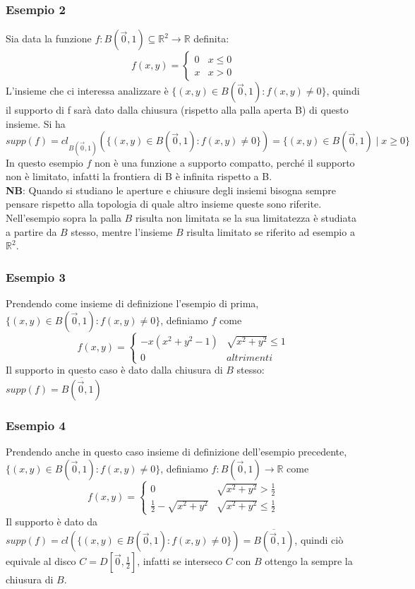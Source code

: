 \documentclass[10pt]{article}
\theoremstyle{plain}
\theoremstyle{definition}
\begin{document}
\subsubsection{Esempio 2}
Sia data la funzione $f: B(\vec{0},1) \subseteq \mathbb{R}^2 \to \mathbb{R}$ definita:
$$f(x,y)=
\begin{cases}
 0 & x \leq 0 \\
 x & x > 0
\end{cases}$$
L'insieme che ci interessa analizzare è $\{ (x,y) \in B(\vec{0},1): f(x,y) \neq 0 \}$, quindi il supporto di f sarà dato dalla chiusura (rispetto alla palla aperta B) di questo insieme. Si ha
$$supp(f) = cl_{B(\vec{0},1)} (\{ (x,y) \in B(\vec{0},1): f(x,y) \neq 0 \}) = \{(x,y) \in B(\vec{0},1) \; | \; x\geq 0 \}$$
In questo esempio $f$ non è una funzione a supporto compatto, perché il supporto non è limitato, infatti la frontiera di B è infinita rispetto a B.\\
\textbf{NB}: Quando si studiano le aperture e chiusure degli insiemi bisogna sempre pensare rispetto alla topologia di quale altro insieme queste sono riferite. Nell'esempio sopra la palla $B$ risulta non limitata se la sua limitatezza è studiata a partire da $B$ stesso, mentre l'insieme $B$ risulta limitato se riferito ad esempio a $\mathbb{R}^2$. 

\subsubsection{Esempio 3}
Prendendo come insieme di definizione l'esempio di prima, $\{ (x,y) \in B(\vec{0},1): f(x,y) \neq 0 \}$, definiamo $f$ come
$$f(x,y)=
\begin{cases}
 -x(x^2 + y^2 -1) & \sqrt{x^2 + y^2} \leq 1 \\
 0 & altrimenti
\end{cases}$$
Il supporto in questo caso è dato dalla chiusura di $B$ stesso: $supp(f) = \overline{B(\vec{0},1)}$
\\
\subsubsection{Esempio 4}
Prendendo anche in questo caso insieme di definizione dell'esempio precedente, $\{ (x,y) \in B(\vec{0},1): f(x,y) \neq 0 \}$, definiamo $f:B(\vec{0},1)\to \mathbb{R}$ come
$$f(x,y)=
\begin{cases}
 0 & \sqrt{x^2 + y^2} > \frac{1}{2} \\
 \frac{1}{2}-\sqrt{x^2 + y^2} & \sqrt{x^2 + y^2} \leq \frac{1}{2}
\end{cases}$$
Il supporto è dato da $supp(f) = cl(\{ (x,y) \in B(\vec{0},1) : f(x,y) \neq 0\})= \overline{B(\vec{0},1)}$, quindi ciò equivale al disco $C=D[\vec{0},\frac{1}{2}]$, infatti se interseco $C$ con $B$ ottengo la sempre la chiusura di $B$.
\end{document}
